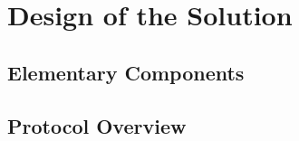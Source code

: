 \section{Design of the Solution}

\subsection{Elementary Components}


\subsection{Protocol Overview}

